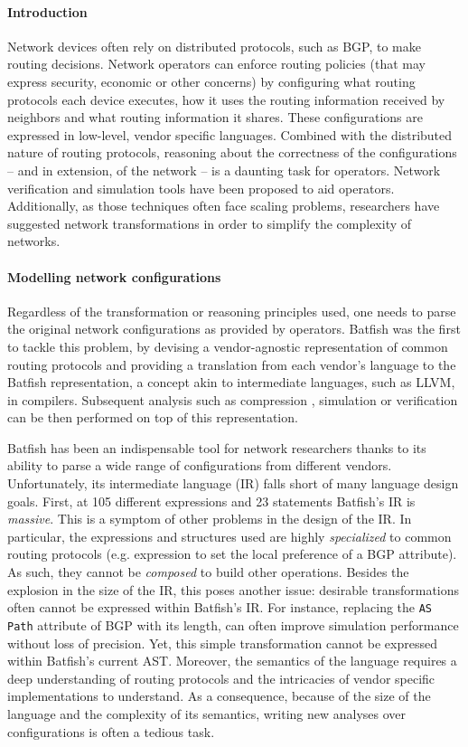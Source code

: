\documentclass[sigconf,10pt]{acmart}
\begin{document}
\paragraph{Introduction}

Network devices often rely on distributed protocols, such as BGP, to
make routing decisions. Network operators can enforce routing policies
(that may express security, economic or other concerns) by configuring
what routing protocols each device executes, how it uses the routing
information received by neighbors and what routing information it
shares. These configurations are expressed in low-level, vendor
specific languages. Combined with the distributed nature of routing
protocols, reasoning about the correctness of the configurations --
and in extension, of the network -- is a daunting task for operators.
Network verification \cite{minesweeper,arc} and simulation tools
\cite{batfish} have been proposed to aid operators. Additionally, as
those techniques often face scaling problems, researchers have
suggested network transformations \cite{bonsai, origami} in order to
simplify the complexity of networks.

\paragraph{Modelling network configurations}
Regardless of the transformation or reasoning principles used, one
needs to parse the original network configurations as provided by
operators. Batfish \cite{batfish} was the first to tackle this
problem, by devising a vendor-agnostic representation of common
routing protocols and providing a translation from each vendor's
language to the Batfish representation, a concept akin to intermediate
languages, such as LLVM, in compilers. Subsequent analysis such as
compression \cite{bonsai}, simulation \cite{batfish} or verification
\cite{minesweeper,arc} can be then performed on top of this
representation.

Batfish has been an indispensable tool for network researchers thanks
to its ability to parse a wide range of configurations from different
vendors. Unfortunately, its intermediate language (IR) falls short of
many language design goals. First, at 105 different expressions and 23
statements Batfish's IR is \emph{massive}. This is a symptom of other
problems in the design of the IR. In particular, the expressions and
structures used are highly \emph{specialized} to common routing
protocols (e.g. expression to set the local preference of a BGP
attribute). As such, they cannot be \emph{composed} to build other
operations. Besides the explosion in the size of the IR, this poses
another issue: desirable transformations often cannot be expressed
within Batfish's IR. For instance, replacing the \texttt{AS Path}
attribute of BGP with its length, can often improve simulation
performance without loss of precision. Yet, this simple transformation
cannot be expressed within Batfish's current AST.  Moreover, the
semantics of the language requires a deep understanding of routing
protocols and the intricacies of vendor specific implementations to
understand. As a consequence, because of the size of the language and
the complexity of its semantics, writing new analyses over
configurations is often a tedious task.
\end{document}

